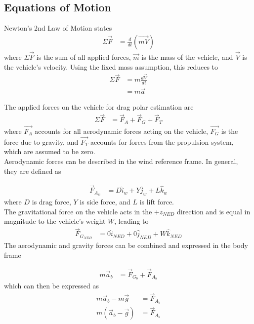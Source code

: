 \subsection*{Equations of Motion}
\label{sys-desc}
Newton's 2nd Law of Motion states
\begin{align}
\Sigma\vec{F} &= \frac{d}{dt}(\vec{mV})
\end{align}
\noindent
where $\Sigma\vec{F}$ is the sum of all applied forces, $\vec{m}$ is the mass of the vehicle, and $\vec{V}$ is the vehicle's velocity. Using the fixed mass assumption, this reduces to 
\begin{align}
\Sigma\vec{F} &= m\frac{d\vec{V}}{dt}\\
&= m\vec{a}
\end{align}

The applied forces on the vehicle for drag polar estimation are 
\begin{align}
\Sigma\vec{F} &= \vec{F}_{A}+\vec{F}_{G}+\vec{F}_{T}
\end{align}
\noindent
where $\vec{F_{A}}$ accounts for all aerodynamic forces acting on the vehicle, $\vec{F_{G}}$ is the force due to gravity, and $\vec{F_{T}}$ accounts for forces from the propulsion system, which are assumed to be zero.\\
Aerodynamic forces can be described in the wind reference frame. In general, they are defined as

\begin{align}
\vec{F}_{A_w} &= D \hat{i}_w+Y \hat{j}_w+L \hat{k}_w
\end{align}
\noindent
where $D$ is drag force, $Y$ is side force, and $L$ is lift force.\\
The gravitational force on the vehicle acts in the $+z_{NED}$ direction and is equal in magnitude to the vehicle's weight $W$, leading to
\begin{align}
\vec{F}_{G_{NED}} &= 0\hat{i}_{NED}+0\hat{j}_{NED}+W\hat{k}_{NED}
\end{align}
The aerodynamic and gravity forces can be combined and expressed in the body frame

\begin{align}
m\vec{a}_b &= \vec{F}_{G_b} + \vec{F}_{A_b}
\end{align}
\noindent
which can then be expressed as 
\begin{align}
m\vec{a}_b - m\vec{g} &= \vec{F}_{A_b}\\
m(\vec{a}_b - \vec{g}) &= \vec{F}_{A_b}
\label{accelerometerEqn}
\end{align}

